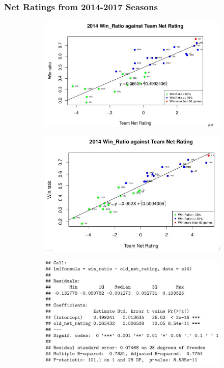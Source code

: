 \documentclass[11pt]{article}
\begin{document}
\subsubsection*{Net Ratings from 2014-2017 Seasons}
\begin{figure}[h!]
  \centering
  \begin{subfigure}[b]{0.45\linewidth}
    \includegraphics[width=\linewidth]{nr_14.jpg}
  \end{subfigure}
  \begin{subfigure}[b]{0.45\linewidth}
    \includegraphics[width=\linewidth]{new_nr_14.jpg}
  \end{subfigure}
  \begin{subfigure}[b]{0.42\linewidth}
    \includegraphics[width=\linewidth]{nr_14_summary.jpg}

\end{subfigure}
\end{figure}
\end{document}
